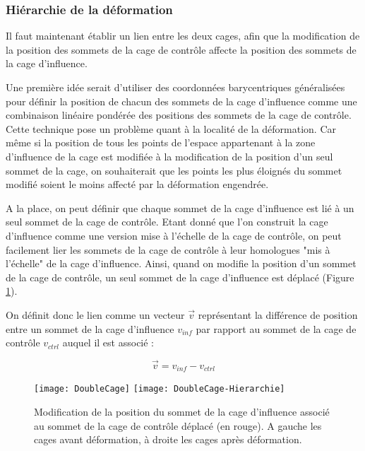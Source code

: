 \subsubsection{Hiérarchie de la déformation}

Il faut maintenant établir un lien entre les deux cages, afin que la
modification de la position des sommets de la cage de contrôle affecte la
position des sommets de la cage d'influence.

Une première idée serait d'utiliser des coordonnées barycentriques
généralisées pour définir la position de chacun des sommets de la cage
d'influence comme une combinaison linéaire pondérée des positions des sommets
de la cage de contrôle. Cette technique pose un problème quant à la localité
de la déformation. Car même si  la position de tous les points de l'espace
appartenant à la zone d'influence de la cage est modifiée à la modification de
la position d'un seul sommet de la cage, on souhaiterait que les points les
plus éloignés du sommet modifié soient le moins affecté par la déformation
engendrée.

A la place, on peut définir que chaque sommet de la cage d'influence est lié à
un seul sommet de la cage de contrôle. Etant donné que l'on construit la cage
d'influence comme une version mise à l'échelle de la cage de contrôle, on peut
facilement lier les sommets de la cage de contrôle à leur homologues "mis à
l'échelle" de la cage d'influence. Ainsi, quand on modifie la position d'un
sommet de la cage de contrôle, un seul sommet de la cage d'influence est
déplacé (Figure \ref{MelHie}).

On définit donc le lien comme un vecteur $\overrightarrow{v}$ représentant la
différence de position entre un sommet de la cage d'influence $v_{inf}$ par
rapport au sommet de la cage de contrôle $v_{ctrl}$ auquel il est associé :

\begin{displaymath}
  \overrightarrow{v} = v_{inf}-v_{ctrl}
\end{displaymath}

\begin{figure}[ht]
\begin{center}
  \texttt{[image: DoubleCage]}
  \texttt{[image: DoubleCage-Hierarchie]}

  \caption[Association des cages de contrôle et d'influence] {Modification de
la position du sommet de la cage d'influence associé au sommet de la cage de
contrôle déplacé (en rouge). A gauche les cages avant déformation, à droite
les cages après déformation.}

  \label{MelHie}
\end{center}
\end{figure}

